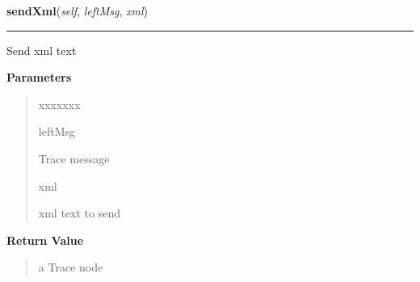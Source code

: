 \hspace{.8\funcindent}\begin{boxedminipage}{\funcwidth}

    \raggedright \textbf{sendXml}(\textit{self}, \textit{leftMsg}, \textit{xml})

    \vspace{-1.5ex}

    \rule{\textwidth}{0.5\fboxrule}
\setlength{\parskip}{2ex}
    Send xml text

\setlength{\parskip}{1ex}
      \textbf{Parameters}
      \vspace{-1ex}

      \begin{quote}
        \begin{Ventry}{xxxxxxx}

          \item[leftMsg]

          Trace message

          \item[xml]

          xml text to send

        \end{Ventry}

      \end{quote}

      \textbf{Return Value}
    \vspace{-1ex}

      \begin{quote}
      a Trace node

      \end{quote}

    \end{boxedminipage}

    \label{tracetool:TraceToSend:sendTable}

    \vspace{0.5ex}

